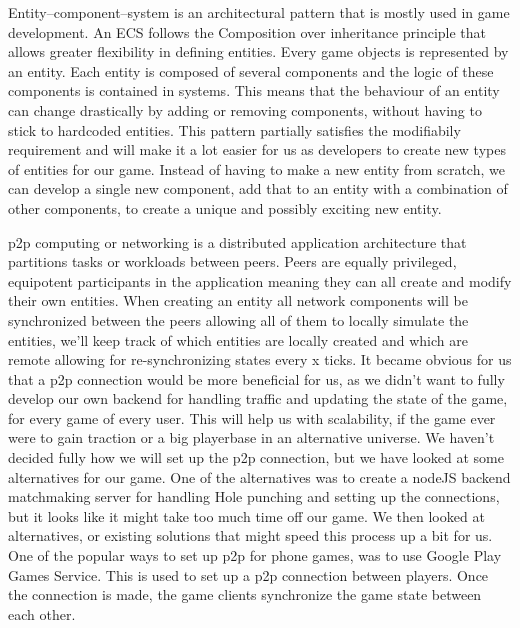 Entity–component–system \cite{wiki:ecs} is an architectural pattern that is mostly used in game development. An ECS follows the Composition over inheritance principle that allows greater flexibility in defining entities.
Every game objects is represented by an entity. Each entity is composed of several components and the logic of these components is contained in systems. This means that the behaviour of an entity can change drastically by adding or removing components, without having to stick to hardcoded entities.
This pattern partially satisfies the modifiabily requirement and will make it a lot easier for us as developers to create new types of entities for our game. Instead of having to make a new entity from scratch, we can develop a single new component, add that to an entity with a combination of other components, to create a unique and possibly exciting new entity.

\gls{p2p} \cite{wiki:p2p} computing or networking is a distributed application architecture that partitions tasks or workloads between peers. Peers are equally privileged, equipotent participants in the application meaning they can all create and modify their own entities. When creating an entity all network components will be synchronized between the peers allowing all of them to locally simulate the entities, we'll keep track of which entities are locally created and which are remote allowing for re-synchronizing states every x ticks.
It became obvious for us that a \gls{p2p} connection would be more beneficial for us, as we didn't want to fully develop our own backend for handling traffic and updating the state of the game, for every game of every user. This will help us with scalability, if the game ever were to gain traction or a big playerbase in an alternative universe.
We haven't decided fully how we will set up the \gls{p2p} connection, but we have looked at some alternatives for our game.
One of the alternatives was to create a nodeJS backend matchmaking server for handling Hole punching\cite{wiki:holePunching} and setting up the connections, but it looks like it might take too much time off our game. We then looked at alternatives, or existing solutions that might speed this process up a bit for us.
One of the popular ways to set up p2p for phone games, was to use Google Play Games Service. This is used to set up a \gls{p2p} connection between players. Once the connection is made, the game clients synchronize the game state between each other.

